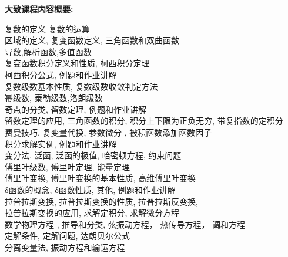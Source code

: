 \documentclass[11pt, a4paper]{article}
\begin{document}
\noindent \textbf{大致课程内容概要:}
\begin{center} 
\begin{minipage}{5in}
\begin{flushleft}
{\color{darkgreen}{\Rectangle}} 复数的定义
复数的运算 	
\\
{\color{darkgreen}{\Rectangle}} 区域的定义, 复变函数定义, 三角函数和双曲函数
\\
{\color{darkgreen}{\Rectangle}}
导数,解析函数,多值函数 
\\
{\color{red}{\Rectangle}}
复变函数积分定义和性质, 柯西积分定理  
\\
{\color{darkgreen}{\Rectangle}}
柯西积分公式,
例题和作业讲解 
\\
{\color{darkgreen}{\Rectangle}}
复数级数基本性质,
复数级数收敛判定方法
\\
{\color{red}{\Rectangle}}
幂级数,
泰勒级数,洛朗级数
\\
{\color{darkgreen}{\Rectangle}}
奇点的分类,
留数定理,
例题和作业讲解  
\\
{\color{red}{\Rectangle}}
留数定理的应用, 三角函数的积分,
积分上下限为正负无穷,
带复指数的定积分  
\\
{\color{darkgreen}{\Rectangle}}
费曼技巧,
复变量代换,
参数微分 ,
被积函数添加函数因子
\\
{\color{darkgreen}{\Rectangle}}
积分求解实例,
例题和作业讲解 
\\
{\color{darkgreen}{\Rectangle}}
变分法,
泛函,
泛函的极值,
哈密顿方程,
约束问题
\\
{\color{red}{\Rectangle}}
傅里叶级数,
傅里叶定理,
能量定理
\\
{\color{red}{\Rectangle}}
傅里叶变换,
傅里叶变换的基本性质,
高维傅里叶变换
\\
{\color{darkgreen}{\Rectangle}}
δ函数的概念,
δ函数性质,
其他,
例题和作业讲解
\\
{\color{darkgreen}{\Rectangle}}
拉普拉斯变换,
拉普拉斯变换的性质,
拉普拉斯反变换,
\\
{\color{darkgreen}{\Rectangle}}
拉普拉斯变换的应用,
求解定积分,
求解微分方程
\\
{\color{darkgreen}{\Rectangle}}
数学物理方程 ,
推导和分类,
弦振动方程，
热传导方程，
调和方程
\\
{\color{red}{\Rectangle}}
定解条件,
定解问题,
达朗贝尔公式
\\
{\color{red}{\Rectangle}}
分离变量法,
振动方程和输运方程
\\
{\color{darkgreen}{\Rectangle}}

\end{flushleft}
\end{minipage}
\end{center}
\end{document}
